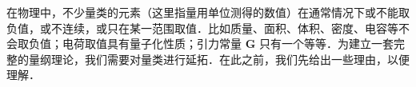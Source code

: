 在物理中，不少量类的元素（这里指量用单位测得的数值）在通常情况下或不能取负值，或不连续，或只在某一范围取值．比如质量、面积、体积、密度、电容等不会取负值；电荷取值具有量子化性质；引力常量 $\boldsymbol{G}$ 只有一个等等．为建立一套完整的量纲理论，我们需要对量类进行延拓．在此之前，我们先给出一些理由，以便理解．

